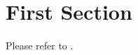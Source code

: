 \documentclass[AIAA-Journal]{nasa-latex-docs}
\begin{document}
\section{First Section}

Please refer to \cite{Template-Guide}.
\end{document}
